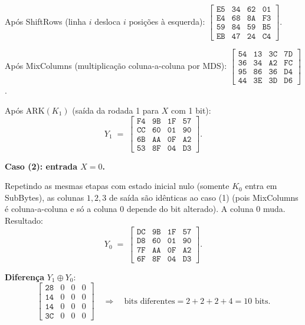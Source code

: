 \documentclass[12pt,a4paper]{article}
\newenvironment{resposta}{%
    \begin{respostabox}
    \color{red!70!black}\sloppy
}{%
    \end{respostabox}
}
\begin{document}
\begin{resposta}
Após ShiftRows (linha $i$ desloca $i$ posições à esquerda):
$\left[\begin{smallmatrix}\texttt{E5}&\texttt{34}&\texttt{62}&\texttt{01}\\\texttt{E4}&\texttt{68}&\texttt{8A}&\texttt{F3}\\\texttt{59}&\texttt{84}&\texttt{59}&\texttt{B5}\\\texttt{EB}&\texttt{47}&\texttt{24}&\texttt{C4}\end{smallmatrix}\right]$.

Após MixColumns (multiplicação coluna-a-coluna por MDS):
$\left[\begin{smallmatrix}\texttt{54}&\texttt{13}&\texttt{3C}&\texttt{7D}\\\texttt{36}&\texttt{34}&\texttt{A2}&\texttt{FC}\\\texttt{95}&\texttt{86}&\texttt{36}&\texttt{D4}\\\texttt{44}&\texttt{3E}&\texttt{3D}&\texttt{D6}\end{smallmatrix}\right]$.

Após $\mathrm{ARK}(K_1)$ (saída da rodada 1 para $X$ com 1 bit):
\[
Y_1 \;=\; \begin{bmatrix}\texttt{F4}&\texttt{9B}&\texttt{1F}&\texttt{57}\\\texttt{CC}&\texttt{60}&\texttt{01}&\texttt{90}\\\texttt{6B}&\texttt{AA}&\texttt{0F}&\texttt{A2}\\\texttt{53}&\texttt{8F}&\texttt{04}&\texttt{D3}\end{bmatrix}.
\]

\textbf{Caso (2): entrada $X = 0$.}

Repetindo as mesmas etapas com estado inicial nulo (somente $K_0$ entra em SubBytes), as colunas $1, 2, 3$ de saída são idênticas ao caso (1) (pois MixColumns é coluna-a-coluna e só a coluna $0$ depende do bit alterado). A coluna $0$ muda. Resultado:
\[
Y_0 \;=\; \begin{bmatrix}\texttt{DC}&\texttt{9B}&\texttt{1F}&\texttt{57}\\\texttt{D8}&\texttt{60}&\texttt{01}&\texttt{90}\\\texttt{7F}&\texttt{AA}&\texttt{0F}&\texttt{A2}\\\texttt{6F}&\texttt{8F}&\texttt{04}&\texttt{D3}\end{bmatrix}.
\]

\textbf{Diferença} $Y_1 \oplus Y_0$:
\[
\begin{bmatrix}\texttt{28}&0&0&0\\\texttt{14}&0&0&0\\\texttt{14}&0&0&0\\\texttt{3C}&0&0&0\end{bmatrix}
\quad\Longrightarrow\quad
\text{bits diferentes} = 2 + 2 + 2 + 4 = \boxed{10 \text{ bits}}.
\]


\end{resposta}
\end{document}
